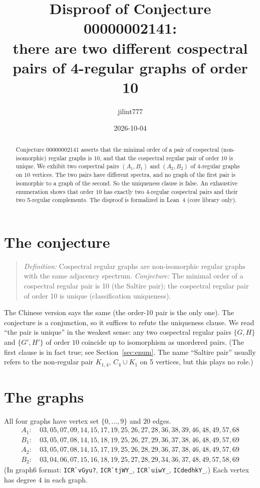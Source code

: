 \documentclass[11pt]{article}
\title{Disproof of Conjecture 00000002141:\\
there are two different cospectral pairs of 4-regular graphs of order 10}
\author{jilint777}
\date{2026-10-04}
\theoremstyle{remark}
\begin{document}
\sloppy
\maketitle

\begin{abstract}
Conjecture 00000002141 asserts that the minimal order of a pair of cospectral
(non-isomorphic) regular graphs is $10$, and that the cospectral regular pair of
order $10$ is unique. We exhibit two cospectral pairs $(A_1,B_1)$ and
$(A_2,B_2)$ of 4-regular graphs on $10$ vertices. The two pairs have
different spectra, and no graph of the first pair is isomorphic to a graph
of the second. So the uniqueness clause is false. An exhaustive enumeration
shows that order $10$ has exactly two 4-regular cospectral pairs and their two
5-regular complements. The disproof is formalized in Lean~4 (core library
only).
\end{abstract}

\section{The conjecture}
\begin{quote}
\emph{Definition:} Cospectral regular graphs are non-isomorphic regular graphs
with the same adjacency spectrum. \emph{Conjecture:} The minimal order of a
cospectral regular pair is 10 (the Saltire pair); the cospectral regular pair
of order 10 is unique (classification uniqueness).
\end{quote}
The Chinese version says the same (the order-10 pair is the only one). The conjecture
is a conjunction, so it suffices to refute the uniqueness clause. We read
``the pair is unique'' in the weakest sense: any two cospectral regular pairs
$\{G,H\}$ and $\{G',H'\}$ of order $10$ coincide up to isomorphism as unordered
pairs. (The first clause is in fact true; see Section~\ref{sec:enum}. The name
``Saltire pair'' usually refers to the non-regular pair $K_{1,4}$,
$C_4\cup K_1$ on 5 vertices, but this plays no role.)

\section{The graphs}
All four graphs have vertex set $\{0,\dots,9\}$ and $20$ edges.
\begin{align*}
A_1:&\ 03,05,07,09,14,15,17,19,25,26,27,28,36,38,39,46,48,49,57,68\\
B_1:&\ 03,05,07,08,14,15,18,19,25,26,27,29,36,37,38,46,48,49,57,69\\
A_2:&\ 03,05,07,08,14,15,17,19,25,26,28,29,36,37,38,46,48,49,57,69\\
B_2:&\ 03,04,06,07,15,16,18,19,25,27,28,29,34,36,37,48,49,57,58,69
\end{align*}
(In graph6 format: \verb|ICR`vGyu?|, \verb|ICR`tjWY_|, \verb|ICR`uiwY_|,
\verb|ICdedhkY_|.) Each vertex has degree $4$ in each graph.
\end{document}
